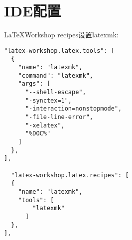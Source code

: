 \section{IDE配置}

\LaTeX Workshop recipes设置latexmk:

\begin{lstlisting}
"latex-workshop.latex.tools": [
  {
    "name": "latexmk",
    "command": "latexmk",
    "args": [
      "--shell-escape",
      "-synctex=1",
      "-interaction=nonstopmode",
      "-file-line-error",
      "-xelatex",
      "%DOC%"
    ]
  },
],

  "latex-workshop.latex.recipes": [
  {
    "name": "latexmk",
    "tools": [
        "latexmk"
      ]
  },
],
\end{lstlisting}
